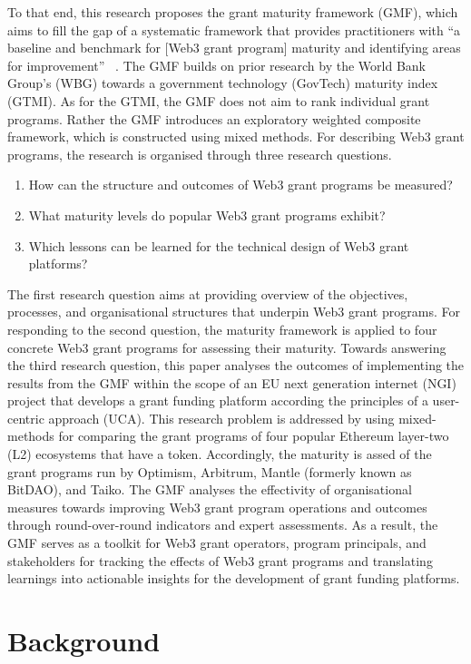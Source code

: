 \documentclass[conference]{IEEEtran}
\begin{document}
To that end, this research proposes the grant maturity framework (GMF), which aims to fill the gap of a systematic framework that provides practitioners with ``a baseline and benchmark for [Web3 grant program] maturity and identifying areas for improvement''~ \cite{dener_govtech_2021}. The GMF builds on prior research by the World Bank Group’s (WBG) towards a government technology (GovTech) maturity index (GTMI). As for the GTMI, the GMF does not aim to rank individual grant programs. Rather the GMF introduces an exploratory weighted composite framework, which is constructed using mixed methods. For describing Web3 grant programs, the research is organised through three research questions.

\begin{enumerate}
\item How can the structure and outcomes of Web3 grant programs be measured?
\item What maturity levels do popular Web3 grant programs exhibit?
\item Which lessons can be learned for the technical design of Web3 grant platforms?
\end{enumerate}

The first research question aims at providing overview of the objectives, processes, and organisational structures that underpin Web3 grant programs. For responding to the second question, the maturity framework is applied to four concrete Web3 grant programs for assessing their maturity. Towards answering the third research question, this paper analyses the outcomes of implementing the results from the GMF within the scope of an EU next generation internet (NGI) project that develops a grant funding platform according the principles of a user-centric approach (UCA). This research problem is addressed by using mixed-methods for comparing the grant programs of four popular Ethereum layer-two (L2) ecosystems that have a token. Accordingly, the maturity is assed of the grant programs run by Optimism, Arbitrum, Mantle (formerly known as BitDAO), and Taiko. The GMF analyses the effectivity of organisational measures towards improving Web3 grant program operations and outcomes through round-over-round indicators and expert assessments. As a result, the GMF serves as a toolkit for Web3 grant operators, program principals, and stakeholders for tracking the effects of Web3 grant programs and translating learnings into actionable insights for the development of grant funding platforms.

\section{Background}\label{sec_2}
\end{document}
